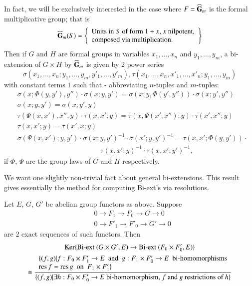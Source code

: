 In fact, we will be exclusively interested in the case where $F=\widehat{\mathbf{G}}_{m}$ is the formal multiplicative group; that is
$$
\widehat{\mathbf{G}}_{m}(S)=
\left\{
\begin{array}{l}
\text{Units in $S$ of form $1+x$, $x$ nilpotent,}\\
\text{composed via multiplication.}
\end{array}
\right\}
$$
Then if $G$ and $H$ are formal groups in variables $x_{1},\ldots,x_{n}$ and $y_{1},\ldots,y_{m}$, a bi-extension of $G\times H$ by $\widehat{\mathbf{G}}_{m}$ is given by 2 power series 
$$
\sigma(x_{1},\ldots,x_{n};y_{1},\ldots,y_{m},y'_{1},\ldots,y'_{m}), \tau(x_{1},\ldots,x_{n},x'_{1},\ldots,x'_{n};y_{1},\ldots,y_{m})
$$ 
with constant terms $1$ such that - abbreviating $n$-tuples and $m$-tuples:
\begin{align*}
& \sigma(x;\Phi(y,y'),y'')\cdot \sigma(x;y,y')=\sigma(x;y,\Phi(y',y''))\cdot \sigma (x;y',y'')\\
& \sigma(x;y,y')=\sigma(x;y',y)\\
& \tau (\Psi(x,x'),x'',y)\cdot \tau(x,x';y)=\tau(x,\Psi(x',x'');y)\cdot \tau(x',x'';y)\\
& \tau (x,x';y)=\tau(x',x;y)\\
& \sigma(\Psi(x,x');y,y')\cdot \sigma(x;y,y')^{-1}\cdot \sigma (x';y,y')^{-1}=\tau(x,x';\Phi(y,y'))\cdot\\
&\hspace{5cm} \tau(x,x';y)^{-1}\cdot \tau(x,x';y')^{-1},
\end{align*}
if $\Phi$, $\Psi$ are the group laws of $G$ and $H$ respectively.

We want one slightly non-trivial fact about general bi-extensions. This result gives essentially the method for computing Bi-ext's via resolutions.

\begin{proposition}\label{art15-prop1}
Let $E$, $G$, $G'$ be abelian group functors as above. Suppose
\begin{align*}
& 0\to F_{1}\to F_{0}\to G\to 0\\
& 0\to F'_{1}\to F'_{0}\to G'\to 0
\end{align*}
are $2$ exact sequences of such functors. Then
{\fontsize{10pt}{12pt}\selectfont
\begin{gather*}
\operatorname{\mathrm{Ker}} \{\text{\rm Bi-ext }(G\times G',E)\to \text{\rm Bi-ext } (F_{0}\times F'_{0},E)\}\\
\cong \frac{\begin{array}{l}\{(f,g)|f:F_{0}\times F'_{1}\to E\text{~ and~ } g:F_{1}\times F'_{0}\to E\text{~ bi-homomorphisms}\\ \operatorname{\mathrm{res}} f=\operatorname{\mathrm{res}} g\text{~ on~ } F_{1}\times F'_{1}\}\end{array}}{\{(f,g)|\exists h:F_{0}\times F'_{0}\to E\text{ bi-homomorphism,~} f \text{~and~} g \text{~restrictions of~} h\}}
\end{gather*}}\relax\pageoriginale
\end{proposition}

